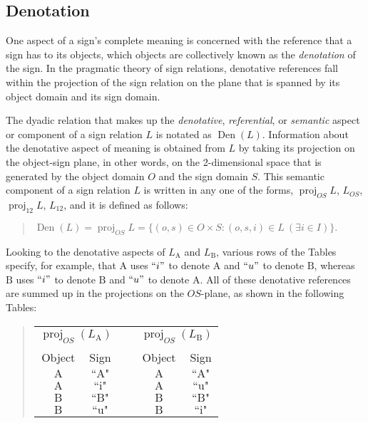 \documentclass[12pt]{article}
\begin{document}
\subsection{Denotation}

One aspect of a sign's complete meaning is concerned with the reference that a sign has to its objects, which objects are collectively known as the \textit{denotation} of the sign.  In the pragmatic theory of sign relations, denotative references fall within the projection of the sign relation on the plane that is spanned by its object domain and its sign domain.

The dyadic relation that makes up the \textit{denotative}, \textit{referential}, or \textit{semantic} aspect or component of a sign relation $L$ is notated as $\operatorname{Den}(L)$.  Information about the denotative aspect of meaning is obtained from $L$ by taking its projection on the object-sign plane, in other words, on the 2-dimensional space that is generated by the object domain $O$ and the sign domain $S$.  This semantic component of a sign relation $L$ is written in any one of the forms, $\operatorname{proj}_{OS}L$, $L_{OS}$, $\operatorname{proj}_{12}L$, $L_{12}$, and it is defined as follows:

\begin{quote}
$\operatorname{Den}(L) = \operatorname{proj}_{OS}L = \{ (o, s) \in O \times S : (o, s, i) \in L\ (\exists i \in I) \}.$
\end{quote}

Looking to the denotative aspects of $L_{\mathrm{A}}$ and $L_{\mathrm{B}}$, various rows of the Tables specify, for example, that $\mathrm{A}$ uses $``i"$ to denote $\mathrm{A}$ and $``u"$ to denote $\mathrm{B}$, whereas $\mathrm{B}$ uses $``i"$ to denote $\mathrm{B}$ and $``u"$ to denote $\mathrm{A}$.  All of these denotative references are summed up in the projections on the $OS$-plane, as shown in the following Tables:

\begin{quote}\begin{tabular}{|c|c|p{2cm}|c|c|}
\multicolumn{2}{c}{$\operatorname{proj}_{OS}(L_{\mathrm{A}})$} &
\multicolumn{1}{c}{~} &
\multicolumn{2}{c}{$\operatorname{proj}_{OS}(L_{\mathrm{B}})$} \\
\cline{1-2}\cline{4-5}
Object & Sign & & Object & Sign \\
\cline{1-2}\cline{4-5}
$\mathrm{A}$ & $\text{``A"}$ &&
$\mathrm{A}$ & $\text{``A"}$ \\
\cline{1-2}\cline{4-5}
$\mathrm{A}$ & $\text{``i"}$ &&
$\mathrm{A}$ & $\text{``u"}$ \\
\cline{1-2}\cline{4-5}
$\mathrm{B}$ & $\text{``B"}$ &&
$\mathrm{B}$ & $\text{``B"}$ \\
\cline{1-2}\cline{4-5}
$\mathrm{B}$ & $\text{``u"}$ &&
$\mathrm{B}$ & $\text{``i"}$ \\
\cline{1-2}\cline{4-5}
\end{tabular}\end{quote}
\end{document}

